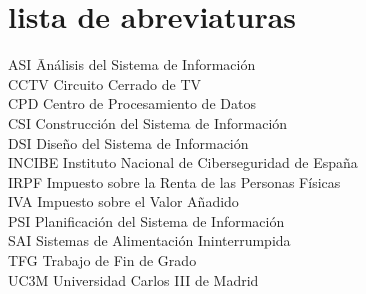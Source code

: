 \newpage %
\thispagestyle{empty}
\mbox{}

\chapter*{lista de abreviaturas}
\begin{tabbing}  %
	ASI \quad\quad\quad\= Análisis del Sistema de Información \\
	CCTV \> Circuito Cerrado de TV \\
	CPD \>  Centro de Procesamiento de Datos \\
	CSI \> Construcción del Sistema de Información \\
	DSI \> Diseño del Sistema de Información \\
	INCIBE \> Instituto Nacional de Ciberseguridad de España \\
	IRPF  \>   Impuesto sobre la Renta de las Personas Físicas \\
	IVA \>  Impuesto sobre el Valor Añadido \\
	PSI \> Planificación del Sistema de Información \\
	SAI \> Sistemas de Alimentación Ininterrumpida \\
	TFG \>  Trabajo de Fin de Grado \\
	UC3M  \>  Universidad Carlos III de Madrid
\end{tabbing}